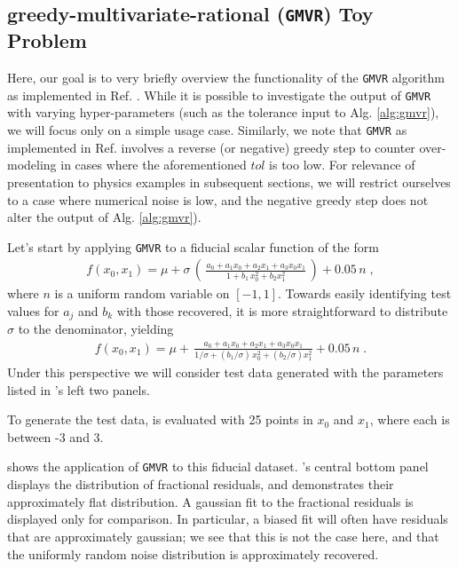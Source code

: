 \documentclass[twocolumn,aps,prd,floatfix,preprintnumbers,a4paper,nofootinbib,
superscriptaddress,10pt]{revtex4-1}
\def\gmvr#1{greedy-multivariate-rational#1
  (\texttt{GMVR}#1)\gdef\gmvr{\texttt{GMVR}}}
\begin{document}
\subsection{\gmvr{} Toy Problem}
%
Here, our goal is to very briefly overview the functionality of the \gmvr{} algorithm as implemented in Ref. \red{[positive]}.
%
While it is possible to investigate the output of \gmvr{} with varying hyper-parameters (such as the tolerance input to Alg. \ref{alg:gmvr}), we will focus only on a simple usage case.
%
Similarly, we note that \gmvr{} as implemented in Ref. \red{[positive]} involves a reverse (or negative) greedy step to counter over-modeling in cases where the aforementioned $tol$ is too low.
%
For relevance of presentation to physics examples in subsequent sections, we will restrict ourselves to a case where numerical noise is low, and the negative greedy step does not alter the output of Alg. \ref{alg:gmvr}).
%
%
\par Let's start by applying \gmvr{} to a fiducial scalar function of the form
%
\begin{align}
  f(x_0,x_1) = \mu + \sigma \, \left( \, \frac{a_0 +a_1  x_0 + a_2 x_1 + a_3 x_0 x_1}{ 1 + b_1 \, x_0^2 +  b_2 x_1^2 } \, \right) + 0.05 \, n \; ,
\end{align}
%
where $n$ is a uniform random variable on $[-1,1]$.
%
Towards easily identifying test values for $a_j$ and $b_k$ with those recovered, it is more straightforward to distribute $\sigma$ to the denominator, yielding
%
\begin{align}
  \label{eq:gmvrtoy1}
  f(x_0,x_1) = \mu + \, \frac{a_0 +a_1  x_0 + a_2 x_1 + a_3 x_0 x_1}{ 1/\sigma + (b_1/\sigma) \, x_0^2 +  (b_2/\sigma) x_1^2 } + 0.05 \, n \; .
\end{align}
%
Under this perspective we will consider test data generated with the parameters listed in 's left two panels.
%
\par To generate the test data,  is evaluated with 25 points in $x_0$ and $x_1$, where each is between -3 and 3.
%
\par {} shows the application of \gmvr{} to this fiducial dataset.
%
's central bottom panel displays the distribution of fractional residuals, and demonstrates their approximately flat distribution. A gaussian fit to the fractional residuals is displayed only for comparison. In particular, a biased fit will often have residuals that are approximately gaussian; we see that this is not the case here, and that the uniformly random noise distribution is approximately recovered.
\end{document}
